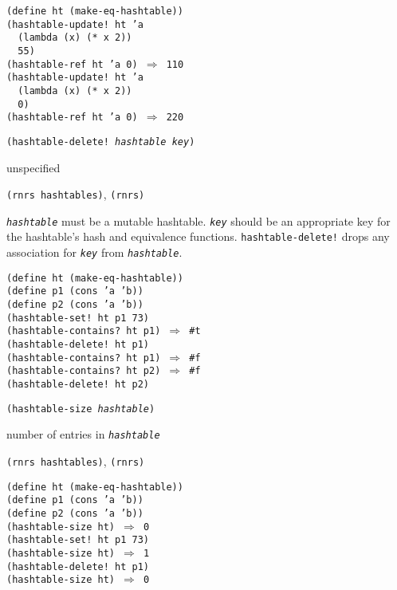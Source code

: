 \begin{alltt}
(define ht (make-eq-hashtable))
(hashtable-update! ht 'a
  (lambda (x) (* x 2))
  55)
(hashtable-ref ht 'a 0) \(\Rightarrow\) 110
(hashtable-update! ht 'a
  (lambda (x) (* x 2))
  0)
(hashtable-ref ht 'a 0) \(\Rightarrow\) 220
\end{alltt}

\begin{description}

\label{objects_s284}\item[procedure] \texttt{(hashtable-delete! \textit{hashtable} \textit{key})}



\item[returns] unspecified


\item[libraries] \texttt{(rnrs hashtables)}, \texttt{(rnrs)}
\end{description}

\texttt{\textit{hashtable}} must be a mutable hashtable.
\texttt{\textit{key}} should be an appropriate key for the hashtable's
hash and equivalence functions.
\texttt{hashtable-delete!} drops any association
for \texttt{\textit{key}} from \texttt{\textit{hashtable}}.

\begin{alltt}
(define ht (make-eq-hashtable))
(define p1 (cons 'a 'b))
(define p2 (cons 'a 'b))
(hashtable-set! ht p1 73)
(hashtable-contains? ht p1) \(\Rightarrow\) \#{}t
(hashtable-delete! ht p1)
(hashtable-contains? ht p1) \(\Rightarrow\) \#{}f
(hashtable-contains? ht p2) \(\Rightarrow\) \#{}f
(hashtable-delete! ht p2)
\end{alltt}

\begin{description}

\label{objects_s285}\item[procedure] \texttt{(hashtable-size \textit{hashtable})}



\item[returns] number of entries in \texttt{\textit{hashtable}}


\item[libraries] \texttt{(rnrs hashtables)}, \texttt{(rnrs)}
\end{description}


\begin{alltt}
(define ht (make-eq-hashtable))
(define p1 (cons 'a 'b))
(define p2 (cons 'a 'b))
(hashtable-size ht) \(\Rightarrow\) 0
(hashtable-set! ht p1 73)
(hashtable-size ht) \(\Rightarrow\) 1
(hashtable-delete! ht p1)
(hashtable-size ht) \(\Rightarrow\) 0
\end{alltt}

